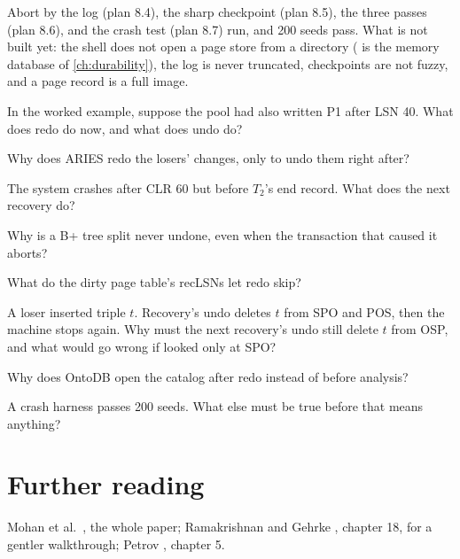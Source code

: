\begin{status}
Abort by the log (plan 8.4), the sharp checkpoint (plan 8.5), the three passes
(plan 8.6), and the crash test (plan 8.7) run, and 200 seeds pass. What is
not built yet: the shell does not open a page store from a directory
( is the memory database of \cref{ch:durability}), the
log is never truncated, checkpoints are not fuzzy, and a page record is a
full image.
\end{status}

\begin{checkyourself}
\item In the worked example, suppose the pool had also written P1 after LSN 40. What does redo do now, and what does undo do?
\item Why does ARIES redo the losers' changes, only to undo them right after?
\item The system crashes after CLR 60 but before $T_2$'s end record. What does the next recovery do?
\item Why is a B+ tree split never undone, even when the transaction that caused it aborts?
\item What do the dirty page table's recLSNs let redo skip?
\item A loser inserted triple $t$. Recovery's undo deletes $t$ from SPO and POS, then the machine stops again. Why must the next recovery's undo still delete $t$ from OSP, and what would go wrong if  looked only at SPO?
\item Why does OntoDB open the catalog after redo instead of before analysis?
\item A crash harness passes 200 seeds. What else must be true before that means anything?
\end{checkyourself}

\section*{Further reading}
Mohan et al.\ \cite{aries}, the whole paper; Ramakrishnan and Gehrke
\cite{cowbook}, chapter 18, for a gentler walkthrough; Petrov \cite{petrov},
chapter 5.
